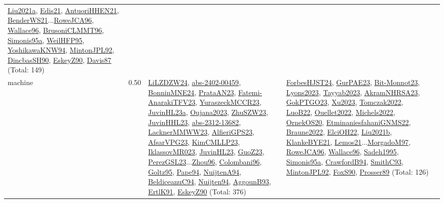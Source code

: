 {\begin{longtable}{p{3cm}r>{\raggedright\arraybackslash}p{6cm}>{\raggedright\arraybackslash}p{6cm}>{\raggedright\arraybackslash}p{8cm}}
\hyperref[detail:Liu2021a]{Liu2021a}, \hyperref[detail:Edis21]{Edis21}, \hyperref[detail:AntuoriHHEN21]{AntuoriHHEN21}, \hyperref[detail:BenderWS21]{BenderWS21}...\hyperref[detail:RoweJCA96]{RoweJCA96}, \hyperref[detail:Wallace96]{Wallace96}, \hyperref[detail:BrusoniCLMMT96]{BrusoniCLMMT96}, \hyperref[detail:Simonis95a]{Simonis95a}, \hyperref[detail:WeilHFP95]{WeilHFP95}, \hyperref[detail:YoshikawaKNW94]{YoshikawaKNW94}, \hyperref[detail:MintonJPL92]{MintonJPL92}, \hyperref[detail:DincbasSH90]{DincbasSH90}, \hyperref[detail:EskeyZ90]{EskeyZ90}, \hyperref[detail:Davis87]{Davis87} (Total: 149)\\
\index{machine}\index{Scheduling!machine}machine &  0.50 & \hyperref[detail:LiLZDZW24]{LiLZDZW24}, \hyperref[detail:abs-2402-00459]{abs-2402-00459}, \hyperref[detail:BonninMNE24]{BonninMNE24}, \hyperref[detail:PrataAN23]{PrataAN23}, \hyperref[detail:Fatemi-AnarakiTFV23]{Fatemi-AnarakiTFV23}, \hyperref[detail:YuraszeckMCCR23]{YuraszeckMCCR23}, \hyperref[detail:JuvinHL23a]{JuvinHL23a}, \hyperref[detail:Oujana2023]{Oujana2023}, \hyperref[detail:ZhuSZW23]{ZhuSZW23}, \hyperref[detail:JuvinHHL23]{JuvinHHL23}, \hyperref[detail:abs-2312-13682]{abs-2312-13682}, \hyperref[detail:LacknerMMWW23]{LacknerMMWW23}, \hyperref[detail:AlfieriGPS23]{AlfieriGPS23}, \hyperref[detail:AfsarVPG23]{AfsarVPG23}, \hyperref[detail:KimCMLLP23]{KimCMLLP23}, \hyperref[detail:IklassovMR023]{IklassovMR023}, \hyperref[detail:JuvinHL23]{JuvinHL23}, \hyperref[detail:GuoZ23]{GuoZ23}, \hyperref[detail:PerezGSL23]{PerezGSL23}...\hyperref[detail:Zhou96]{Zhou96}, \hyperref[detail:Colombani96]{Colombani96}, \hyperref[detail:Goltz95]{Goltz95}, \hyperref[detail:Pape94]{Pape94}, \hyperref[detail:NuijtenA94]{NuijtenA94}, \hyperref[detail:BeldiceanuC94]{BeldiceanuC94}, \hyperref[detail:Nuijten94]{Nuijten94}, \hyperref[detail:AggounB93]{AggounB93}, \hyperref[detail:ErtlK91]{ErtlK91}, \hyperref[detail:EskeyZ90]{EskeyZ90} (Total: 376) & \hyperref[detail:ForbesHJST24]{ForbesHJST24}, \hyperref[detail:GurPAE23]{GurPAE23}, \hyperref[detail:Bit-Monnot23]{Bit-Monnot23}, \hyperref[detail:Lyons2023]{Lyons2023}, \hyperref[detail:Tayyab2023]{Tayyab2023}, \hyperref[detail:AkramNHRSA23]{AkramNHRSA23}, \hyperref[detail:GokPTGO23]{GokPTGO23}, \hyperref[detail:Xu2023]{Xu2023}, \hyperref[detail:Tomczak2022]{Tomczak2022}, \hyperref[detail:LuoB22]{LuoB22}, \hyperref[detail:Ouellet2022]{Ouellet2022}, \hyperref[detail:Michels2022]{Michels2022}, \hyperref[detail:OrnekOS20]{OrnekOS20}, \hyperref[detail:EtminaniesfahaniGNMS22]{EtminaniesfahaniGNMS22}, \hyperref[detail:Braune2022]{Braune2022}, \hyperref[detail:ElciOH22]{ElciOH22}, \hyperref[detail:Liu2021b]{Liu2021b}, \hyperref[detail:KlankeBYE21]{KlankeBYE21}, \hyperref[detail:Lemos21]{Lemos21}...\hyperref[detail:MorgadoM97]{MorgadoM97}, \hyperref[detail:RoweJCA96]{RoweJCA96}, \hyperref[detail:Wallace96]{Wallace96}, \hyperref[detail:Sadeh1995]{Sadeh1995}, \hyperref[detail:Simonis95a]{Simonis95a}, \hyperref[detail:CrawfordB94]{CrawfordB94}, \hyperref[detail:SmithC93]{SmithC93}, \hyperref[detail:MintonJPL92]{MintonJPL92}, \hyperref[detail:FoxS90]{FoxS90}, \hyperref[detail:Prosser89]{Prosser89} (Total: 126) & 
\end{longtable}}
